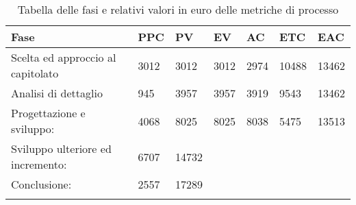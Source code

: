 

\begin{longtable}{f m m m m m m}  
			 Fase & PPC & PV & EV & AC & ETC & EAC \\
\endhead

Scelta ed approccio al capitolato & 3012 & 3012  & 3012 & 2974 & 10488 & 13462 \\
\hline
Analisi di dettaglio 			  & 945  & 3957  & 3957 & 3919 & 9543  & 13462 \\
\hline
Progettazione e sviluppo:  		  & 4068 & 8025  & 8025 & 8038 & 5475  & 13513 \\
\hline
Sviluppo ulteriore ed incremento: & 6707 & 14732 & & & & \\
\hline
Conclusione:  			  		  & 2557 & 17289 & & & & \\
\hline


\bottomrule
\caption{Tabella delle fasi e relativi valori in euro delle metriche di processo}
\end{longtable}